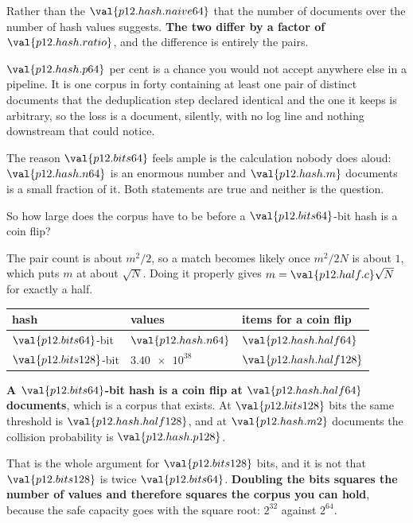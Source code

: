 \begin{fr}
Rather than the $\val{p12.hash.naive64}$ that the number of documents over the
number of hash values suggests. \textbf{The two differ by a factor of
$\val{p12.hash.ratio}$}, and the difference is entirely the pairs.

\begin{aibox}
$\val{p12.hash.p64}$ per cent is a chance you would not accept anywhere else in
a pipeline. It is one corpus in forty containing at least one pair of distinct
documents that the deduplication step declared identical \dash{} and the one
it keeps is arbitrary, so the loss is a document, silently, with no log line
and nothing downstream that could notice.

The reason $\val{p12.bits64}$ feels ample is the calculation nobody does
aloud: $\val{p12.hash.n64}$ is an enormous number and
$\val{p12.hash.m}$ documents is a small fraction of it. Both statements are
true and neither is the question.
\end{aibox}
\end{fr}

\begin{fr}
So how large does the corpus have to be before a $\val{p12.bits64}$-bit hash
is a coin flip?

The pair count is about $m^{2}/2$, so a match becomes likely once
$m^{2}/2N$ is about $1$, which puts $m$ at about $\sqrt{N}$. Doing it properly
gives $m = \val{p12.half.c}\sqrt{N}$ for exactly a half.

\begin{center}
\begin{tabular}{lll}
\toprule
\textbf{hash} & \textbf{values} & \textbf{items for a coin flip} \\
\midrule
$\val{p12.bits64}$-bit & $\val{p12.hash.n64}$ & $\val{p12.hash.half64}$ \\
$\val{p12.bits128}$-bit & $\num{3.40e38}$ & $\val{p12.hash.half128}$ \\
\bottomrule
\end{tabular}
\end{center}

\textbf{A $\val{p12.bits64}$-bit hash is a coin flip at
$\val{p12.hash.half64}$ documents}, which is a corpus that exists. At
$\val{p12.bits128}$ bits the same threshold is $\val{p12.hash.half128}$, and
at $\val{p12.hash.m2}$ documents the collision probability is
$\val{p12.hash.p128}$.

That is the whole argument for $\val{p12.bits128}$ bits, and it is not that
$\val{p12.bits128}$ is twice $\val{p12.bits64}$. \textbf{Doubling the bits
squares the number of values and therefore squares the corpus you can hold},
because the safe capacity goes with the square root: $2^{32}$ against
$2^{64}$.
\end{fr}

